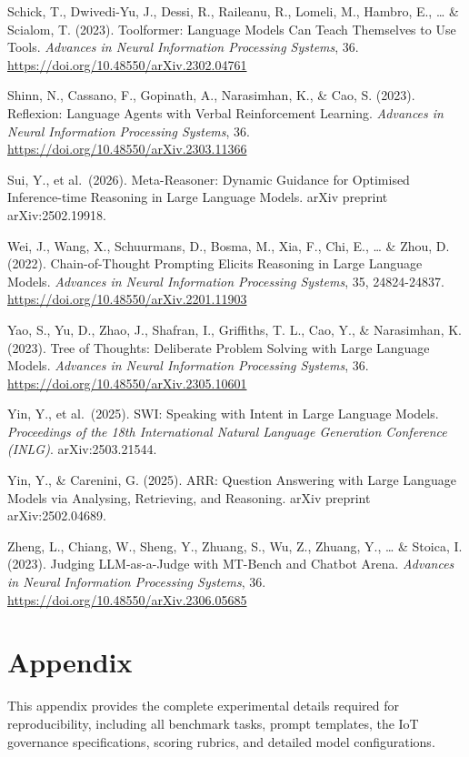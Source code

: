 \documentclass[11pt,a4paper]{article}
\begin{document}
Schick, T., Dwivedi-Yu, J., Dessi, R., Raileanu, R., Lomeli, M., Hambro,
E., \ldots{} \& Scialom, T. (2023). Toolformer: Language Models Can
Teach Themselves to Use Tools. \emph{Advances in Neural Information
Processing Systems}, 36. \url{https://doi.org/10.48550/arXiv.2302.04761}

Shinn, N., Cassano, F., Gopinath, A., Narasimhan, K., \& Cao, S. (2023).
Reflexion: Language Agents with Verbal Reinforcement Learning.
\emph{Advances in Neural Information Processing Systems}, 36.
\url{https://doi.org/10.48550/arXiv.2303.11366}

Sui, Y., et al.~(2026). Meta-Reasoner: Dynamic Guidance for Optimised
Inference-time Reasoning in Large Language Models. arXiv preprint
arXiv:2502.19918.

Wei, J., Wang, X., Schuurmans, D., Bosma, M., Xia, F., Chi, E., \ldots{}
\& Zhou, D. (2022). Chain-of-Thought Prompting Elicits Reasoning in
Large Language Models. \emph{Advances in Neural Information Processing
Systems}, 35, 24824-24837.
\url{https://doi.org/10.48550/arXiv.2201.11903}

Yao, S., Yu, D., Zhao, J., Shafran, I., Griffiths, T. L., Cao, Y., \&
Narasimhan, K. (2023). Tree of Thoughts: Deliberate Problem Solving with
Large Language Models. \emph{Advances in Neural Information Processing
Systems}, 36. \url{https://doi.org/10.48550/arXiv.2305.10601}

Yin, Y., et al.~(2025). SWI: Speaking with Intent in Large Language
Models. \emph{Proceedings of the 18th International Natural Language
Generation Conference (INLG)}. arXiv:2503.21544.

Yin, Y., \& Carenini, G. (2025). ARR: Question Answering with Large
Language Models via Analysing, Retrieving, and Reasoning. arXiv preprint
arXiv:2502.04689.

Zheng, L., Chiang, W., Sheng, Y., Zhuang, S., Wu, Z., Zhuang, Y.,
\ldots{} \& Stoica, I. (2023). Judging LLM-as-a-Judge with MT-Bench and
Chatbot Arena. \emph{Advances in Neural Information Processing Systems},
36. \url{https://doi.org/10.48550/arXiv.2306.05685}

\section{Appendix}\label{appendix}

This appendix provides the complete experimental details required for
reproducibility, including all benchmark tasks, prompt templates, the
IoT governance specifications, scoring rubrics, and detailed model
configurations.
\end{document}
